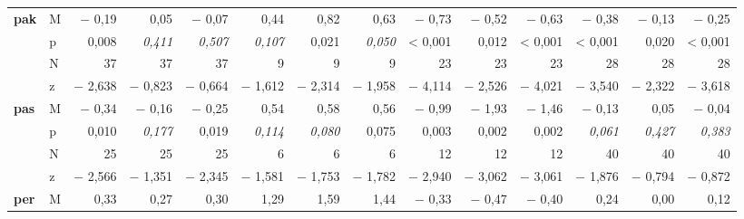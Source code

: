 \begin{sidewaystable}
\begin{tabularx}{\textwidth}{llrrrrrrrrrrrr}
\textbf{pak} & M & \cellcolor{lsLightGreen}$-$ 0,19 & 0,05 & $-$ 0,07 & 0,44 & \cellcolor{lsLightGreen}0,82 & 0,63 & \cellcolor{lsLightGreen}$-$ 0,73 & \cellcolor{lsLightGreen}$-$ 0,52 & \cellcolor{lsLightGreen}$-$ 0,63 & \cellcolor{lsLightGreen}$-$ 0,38 & \cellcolor{lsLightGreen}$-$ 0,13 & \cellcolor{lsLightGreen}$-$ 0,25\\
& p & \cellcolor{lsLightGreen}0,008 & \textit{0,411} & \textit{0,507} & \textit{0,107} & \cellcolor{lsLightGreen}0,021 & \textit{0,050} & \cellcolor{lsLightGreen}< 0,001 & \cellcolor{lsLightGreen}0,012 & \cellcolor{lsLightGreen}< 0,001 & \cellcolor{lsLightGreen}< 0,001 & \cellcolor{lsLightGreen}0,020 & \cellcolor{lsLightGreen}< 0,001\\
& N & \cellcolor{lsLightGreen}37 & 37 & 37 & 9 & \cellcolor{lsLightGreen}9 & 9 & \cellcolor{lsLightGreen}23 & \cellcolor{lsLightGreen}23 & \cellcolor{lsLightGreen}23 & \cellcolor{lsLightGreen}28 & \cellcolor{lsLightGreen}28 & \cellcolor{lsLightGreen}28\\
& z & \cellcolor{lsLightGreen}$-$ 2,638 & $-$ 0,823 & $-$ 0,664 & $-$ 1,612 & \cellcolor{lsLightGreen}$-$ 2,314 & $-$ 1,958 & \cellcolor{lsLightGreen}$-$ 4,114 & \cellcolor{lsLightGreen}$-$ 2,526 & \cellcolor{lsLightGreen}$-$ 4,021 & \cellcolor{lsLightGreen}$-$ 3,540 & \cellcolor{lsLightGreen}$-$ 2,322 & \cellcolor{lsLightGreen}$-$ 3,618\\
\textbf{pas} & M & \cellcolor{lsLightGreen}$-$ 0,34 &  $-$ 0,16 & \cellcolor{lsLightGreen}$-$ 0,25 & 0,54 & 0,58 & 0,56 & \cellcolor{lsLightGreen}$-$ 0,99 & \cellcolor{lsLightGreen}$-$ 1,93 & \cellcolor{lsLightGreen}$-$ 1,46 & $-$ 0,13 & 0,05 & $-$ 0,04\\
& p & \cellcolor{lsLightGreen}0,010 & \textit{0,177} & \cellcolor{lsLightGreen}0,019 & \textit{0,114} & \textit{0,080} & 0,075 & \cellcolor{lsLightGreen}0,003 & \cellcolor{lsLightGreen}0,002 & \cellcolor{lsLightGreen}0,002 & \textit{0,061} & \textit{0,427} & \textit{0,383}\\
& N & \cellcolor{lsLightGreen}25 & 25 & \cellcolor{lsLightGreen}25 & 6 & 6 & 6 & \cellcolor{lsLightGreen}12 & \cellcolor{lsLightGreen}12 & \cellcolor{lsLightGreen}12 & 40 & 40 & 40\\
& z & \cellcolor{lsLightGreen}$-$ 2,566 & $-$ 1,351 & \cellcolor{lsLightGreen}$-$ 2,345 & $-$ 1,581 & $-$ 1,753 & $-$ 1,782 & \cellcolor{lsLightGreen}$-$ 2,940 & \cellcolor{lsLightGreen}$-$ 3,062 & \cellcolor{lsLightGreen}$-$ 3,061 & $-$ 1,876 & $-$ 0,794 & $-$ 0,872\\
\textbf{per} & M & \cellcolor{lsLightGreen}0,33 & 0,27 & \cellcolor{lsLightGreen}0,30 & \cellcolor{lsLightGreen}1,29 & \cellcolor{lsLightGreen}1,59 & \cellcolor{lsLightGreen}1,44 & \cellcolor{lsLightGreen}$-$ 0,33 & \cellcolor{lsLightGreen}$-$ 0,47 & \cellcolor{lsLightGreen}$-$ 0,40 & \cellcolor{lsLightGreen}0,24 & 0,00 & \cellcolor{lsLightGreen}0,12\\

\end{tabularx}
\end{sidewaystable}
